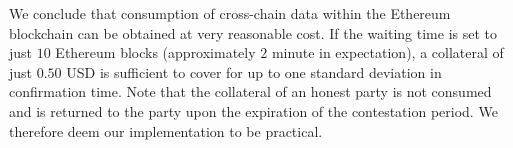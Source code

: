 We conclude that consumption of cross-chain data within the Ethereum blockchain can
be obtained at very reasonable cost. If the waiting time is set to just $10$ Ethereum blocks
(approximately $2$ minute in expectation), a collateral of just $0.50$ USD is sufficient
to cover for up to one standard deviation in confirmation time. Note that the
collateral of an honest party is not consumed and is returned to the party upon the
expiration of the contestation period. We therefore deem our implementation to be
practical.
